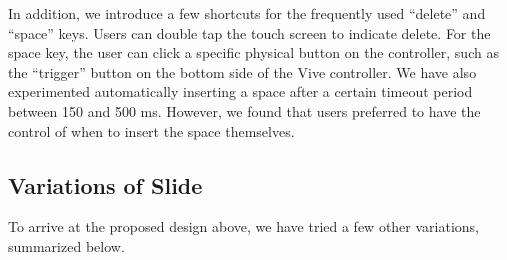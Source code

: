 In addition, we introduce a few shortcuts for the frequently used ``delete'' and ``space'' keys.   Users can double tap the touch screen to indicate delete.  For the space key, the user can click a specific physical button on the controller, such as the ``trigger'' button on the bottom side of the Vive controller.  We have also experimented automatically inserting a space after a certain timeout period between 150 and 500 ms.  However, we found that users preferred to have the control of when to insert the space themselves.   

\subsection{Variations of Slide}
 
To arrive at the proposed design above, we have tried a few other variations, summarized below. 

